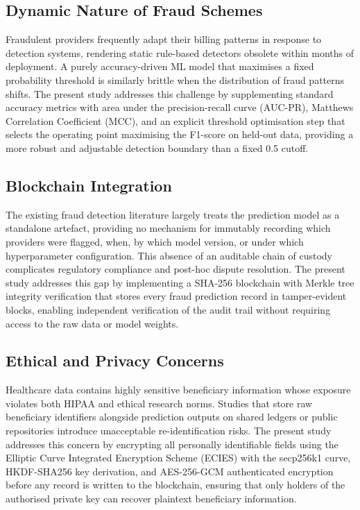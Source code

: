 \subsection{Dynamic Nature of Fraud Schemes}

Fraudulent providers frequently adapt their billing patterns in response to
detection systems, rendering static rule-based detectors obsolete within months
of deployment. A purely accuracy-driven ML model that maximises a fixed
probability threshold is similarly brittle when the distribution of fraud patterns
shifts. The present study addresses this challenge by supplementing standard
accuracy metrics with area under the precision-recall curve (AUC-PR), Matthews
Correlation Coefficient (MCC), and an explicit threshold optimisation step that
selects the operating point maximising the F1-score on held-out data, providing
a more robust and adjustable detection boundary than a fixed 0.5 cutoff.

\subsection{Blockchain Integration}

The existing fraud detection literature largely treats the prediction model as a
standalone artefact, providing no mechanism for immutably recording which
providers were flagged, when, by which model version, or under which
hyperparameter configuration. This absence of an auditable chain of custody
complicates regulatory compliance and post-hoc dispute resolution. The present
study addresses this gap by implementing a SHA-256 blockchain with Merkle tree
integrity verification that stores every fraud prediction record in tamper-evident
blocks, enabling independent verification of the audit trail without requiring
access to the raw data or model weights.

\subsection{Ethical and Privacy Concerns}

Healthcare data contains highly sensitive beneficiary information whose exposure
violates both HIPAA and ethical research norms. Studies that store raw beneficiary
identifiers alongside prediction outputs on shared ledgers or public repositories
introduce unacceptable re-identification risks. The present study addresses this
concern by encrypting all personally identifiable fields using the Elliptic Curve
Integrated Encryption Scheme (ECIES) with the secp256k1 curve, HKDF-SHA256 key
derivation, and AES-256-GCM authenticated encryption before any record is written
to the blockchain, ensuring that only holders of the authorised private key can
recover plaintext beneficiary information.

